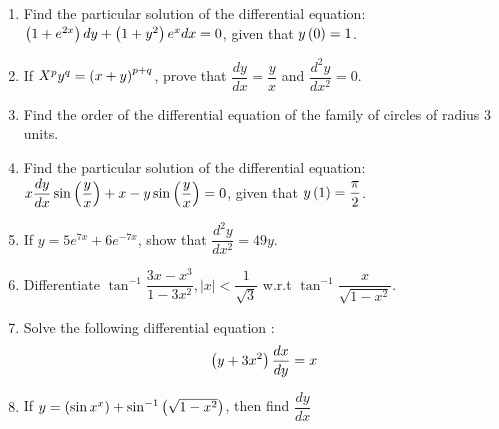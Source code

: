 \begin{enumerate}
\item Find the particular solution of the differential equation: $\left(1+e^{2x}\right){dy}+\left(1+y{^2}\right){e^{x}{dx}}=0$, given that $y\left(0\right)=1$.

\item If $X^{p}y^{q}= \left(x+y\right)^{p+q}$, prove that $\dfrac{dy}{dx}=\dfrac{y}{x}$ and $\dfrac{d^{2}y}{dx^{2}}=0$.

\item Find the order of the differential equation of the family of circles of radius $3$ units.

\item Find the particular solution of the differential equation: $x\dfrac{dy}{dx}\sin\left(\dfrac{y}{x}\right)+x-y\sin\left(\dfrac{y}{x}\right)=0$, given that $y\left(1\right)=\dfrac{\pi}{2}$.

\item If $y=5e^{7x}+6e^{-7x}$, show that $\dfrac{d^2{y}}{d{x^2}}=49y$.

\item Differentiate $\tan^{-1}\dfrac{3x-{x^3}}{1-3x^2}, \vert{x}\vert<\dfrac{1}{\sqrt{3}}$ w.r.t $\tan^{-1}\dfrac{x}{\sqrt{1-x^2}}$.

\item Solve the following differential equation :
    \begin{align*}          
    \left(y + 3x^{2}\right)\dfrac{dx}{dy}=x
    \end{align*}

\item If $y = \left(\sin{x}^x\right)+\sin^{-1}\left(\sqrt{1-x^2}\right)$, then find $\dfrac{dy}{dx}$

\end{enumerate}
